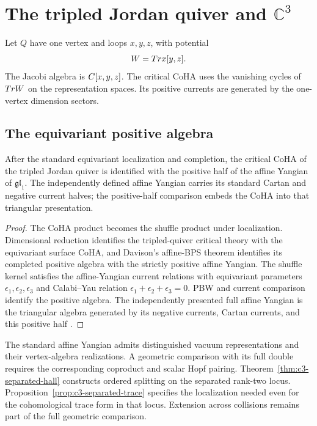 \chapter{The tripled Jordan quiver and \texorpdfstring{$\mathbb C^3$}{C3}}
Let $Q$ have one vertex and loops $x,y,z$, with potential
\[
 W=Tr x[y,z].
\]
The Jacobi algebra is $C[x,y,z]$. The critical CoHA uses the vanishing cycles of $Tr W$ on the representation spaces. Its positive currents are generated by the one-vertex dimension sectors.



\section{The equivariant positive algebra}

\begin{theorem}
After the standard equivariant localization and completion, the critical CoHA of the tripled Jordan quiver is identified with the positive half of the affine Yangian of $\mathfrak{gl}_1$. The independently defined affine Yangian carries its standard Cartan and negative current halves; the positive-half comparison embeds the CoHA into that triangular presentation.
\end{theorem}
\begin{proof}
The CoHA product becomes the shuffle product under localization. Dimensional reduction identifies the tripled-quiver critical theory with the equivariant surface CoHA, and Davison's affine-BPS theorem identifies its completed positive algebra with the strictly positive affine Yangian. The shuffle kernel satisfies the affine-Yangian current relations with equivariant parameters $\epsilon_1,\epsilon_2,\epsilon_3$ and Calabi--Yau relation $\epsilon_1+\epsilon_2+\epsilon_3=0$. PBW and current comparison identify the positive algebra. The independently presented full affine Yangian is the triangular algebra generated by its negative currents, Cartan currents, and this positive half \cite{DavisonAffineBPS,DavisonMeinhardt,SVYangians,Tsymbaliuk}.
\end{proof}

The standard affine Yangian admits distinguished vacuum representations
and their vertex-algebra realizations. A geometric comparison with its
full double requires the corresponding coproduct and scalar Hopf pairing.
Theorem~\ref{thm:c3-separated-hall} constructs ordered splitting on the
separated rank-two locus. Proposition~\ref{prop:c3-separated-trace}
specifies the localization needed even for the cohomological trace form
in that locus. Extension across collisions remains part of the full
geometric comparison.

